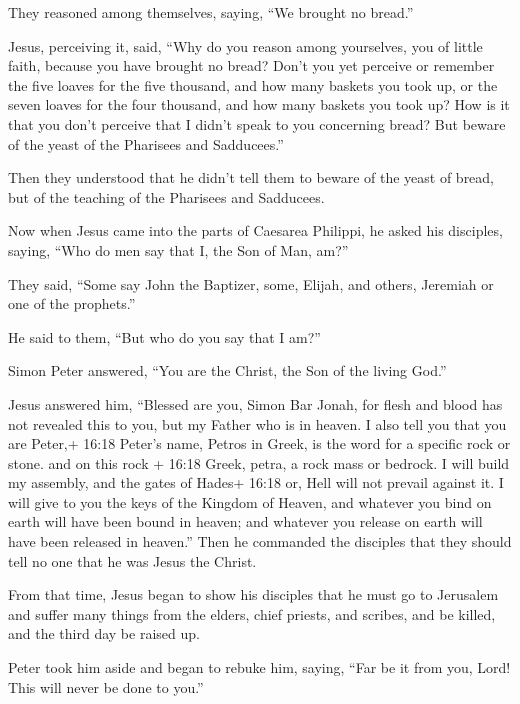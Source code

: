  They reasoned among themselves, saying, ``We brought no
bread.''

 Jesus, perceiving it, said, ``Why do you reason among
yourselves, you of little faith, because you have brought no bread?
 Don't you yet perceive or remember the five loaves for the
five thousand, and how many baskets you took up,  or the
seven loaves for the four thousand, and how many baskets you took up?
 How is it that you don't perceive that I didn't speak to
you concerning bread? But beware of the yeast of the Pharisees and
Sadducees.''

 Then they understood that he didn't tell them to beware of
the yeast of bread, but of the teaching of the Pharisees and Sadducees.

 Now when Jesus came into the parts of Caesarea Philippi,
he asked his disciples, saying, ``Who do men say that I, the Son of Man,
am?''

 They said, ``Some say John the Baptizer, some, Elijah, and
others, Jeremiah or one of the prophets.''

 He said to them, ``But who do you say that I am?''

 Simon Peter answered, ``You are the Christ, the Son of the
living God.''

 Jesus answered him, ``Blessed are you, Simon Bar Jonah,
for flesh and blood has not revealed this to you, but my Father who is
in heaven.  I also tell you that you are Peter,+ 16:18
Peter's name, Petros in Greek, is the word for a specific rock or stone.
and on this rock + 16:18 Greek, petra, a rock mass or bedrock. I will
build my assembly, and the gates of Hades+ 16:18 or, Hell will not
prevail against it.  I will give to you the keys of the
Kingdom of Heaven, and whatever you bind on earth will have been bound
in heaven; and whatever you release on earth will have been released in
heaven.''  Then he commanded the disciples that they should
tell no one that he was Jesus the Christ.

 From that time, Jesus began to show his disciples that he
must go to Jerusalem and suffer many things from the elders, chief
priests, and scribes, and be killed, and the third day be raised up.

 Peter took him aside and began to rebuke him, saying,
``Far be it from you, Lord! This will never be done to you.''

